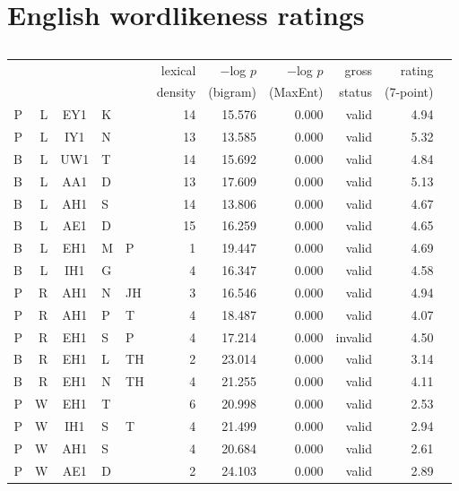 \chapter{English wordlikeness ratings} 
\label{ratings}

\section{\citet{Albright2007}}

\begin{longtable}{r@{ }r@{ }c@{ }ll rrrrrr}
\toprule
   &   &     &   &    & lexical & $-$log $p$ & $-$log $p$ & gross  & rating    \\
   &   &     &   &    & density & (bigram)   & (MaxEnt)   & status & (7-point) \\
\midrule
 P & L & EY1 & K &    & 14 & 15.576 &  0.000 &   valid & 4.94 \\
 P & L & IY1 & N &    & 13 & 13.585 &  0.000 &   valid & 5.32 \\
 B & L & UW1 & T &    & 14 & 15.692 &  0.000 &   valid & 4.84 \\
 B & L & AA1 & D &    & 13 & 17.609 &  0.000 &   valid & 5.13 \\
 B & L & AH1 & S &    & 14 & 13.806 &  0.000 &   valid & 4.67 \\
 B & L & AE1 & D &    & 15 & 16.259 &  0.000 &   valid & 4.65 \\
 B & L & EH1 & M &  P &  1 & 19.447 &  0.000 &   valid & 4.69 \\
 B & L & IH1 & G &    &  4 & 16.347 &  0.000 &   valid & 4.58 \\
 P & R & AH1 & N & JH &  3 & 16.546 &  0.000 &   valid & 4.94 \\
 P & R & AH1 & P &  T &  4 & 18.487 &  0.000 &   valid & 4.07 \\
 P & R & EH1 & S &  P &  4 & 17.214 &  0.000 & invalid & 4.50 \\
 B & R & EH1 & L & TH &  2 & 23.014 &  0.000 &   valid & 3.14 \\
 B & R & EH1 & N & TH &  4 & 21.255 &  0.000 &   valid & 4.11 \\
 P & W & EH1 & T &    &  6 & 20.998 &  0.000 &   valid & 2.53 \\
 P & W & IH1 & S &  T &  4 & 21.499 &  0.000 &   valid & 2.94 \\
 P & W & AH1 & S &    &  4 & 20.684 &  0.000 &   valid & 2.61 \\
 P & W & AE1 & D &    &  2 & 24.103 &  0.000 &   valid & 2.89 \\

\end{longtable}
